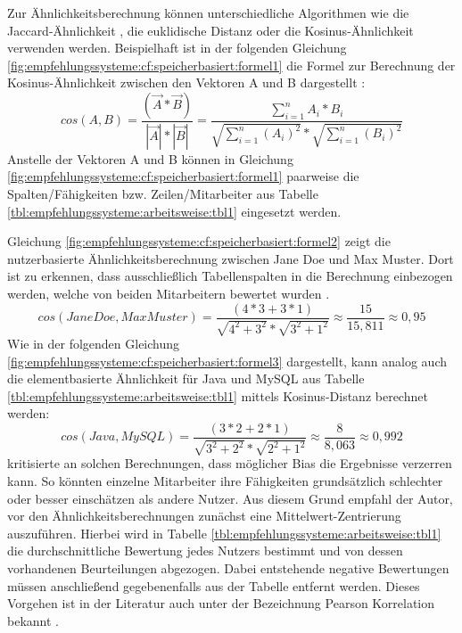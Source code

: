 Zur Ähnlichkeitsberechnung können unterschiedliche Algorithmen wie die Jaccard-Ähnlichkeit \cite[S. 2]{bharti:2019}, die euklidische Distanz \cite[S. 3]{cheng:2013} oder die Kosinus-Ähnlichkeit \cite[S. 2]{duong:2018} verwenden werden. Beispielhaft ist in der folgenden Gleichung \ref{fig:empfehlungssysteme:cf:speicherbasiert:formel1} die Formel zur Berechnung der Kosinus-Ähnlichkeit zwischen den Vektoren A und B dargestellt \cite[S. 111]{bharti:2019}:
\begin{equation}
cos(A,B) = \frac{(\vec{A} * \vec{B})}{|\vec{A}| * |\vec{B}|} = \frac{\sum_{i=1}^n A_i * B_i}{\sqrt{\sum_{i=1}^n (A_i)^2} * \sqrt{\sum_{i=1}^n (B_i)^2}}
\label{fig:empfehlungssysteme:cf:speicherbasiert:formel1}
\end{equation}
Anstelle der Vektoren A und B können in Gleichung \ref{fig:empfehlungssysteme:cf:speicherbasiert:formel1} paarweise die Spalten/Fähigkeiten bzw. Zeilen/Mitarbeiter aus Tabelle \ref{tbl:empfehlungssysteme:arbeitsweise:tbl1} eingesetzt werden.

Gleichung \ref{fig:empfehlungssysteme:cf:speicherbasiert:formel2} zeigt die nutzerbasierte Ähnlichkeitsberechnung zwischen Jane Doe und Max Muster. Dort ist zu erkennen, dass ausschließlich Tabellenspalten in die Berechnung einbezogen werden, welche von beiden Mitarbeitern bewertet wurden \cite[S. 2f.]{hao:2013}.
\begin{equation}
	cos(Jane Doe,Max Muster) = \frac{(4*3 + 3*1)}{\sqrt{4^2 + 3^2} * \sqrt{3^2 + 1^2}} \approx \frac{15}{15,811} \approx 0,95
	\label{fig:empfehlungssysteme:cf:speicherbasiert:formel2}
\end{equation}
Wie in der folgenden Gleichung \ref{fig:empfehlungssysteme:cf:speicherbasiert:formel3} dargestellt, kann analog auch die elementbasierte Ähnlichkeit für Java und MySQL aus Tabelle \ref{tbl:empfehlungssysteme:arbeitsweise:tbl1} mittels Kosinus-Distanz berechnet werden:
\begin{equation}
	cos(Java, MySQL) = \frac{(3*2 + 2*1)}{\sqrt{3^2 + 2^2} * \sqrt{2^2 + 1^2}} \approx \frac{8}{8,063} \approx 0,992
	\label{fig:empfehlungssysteme:cf:speicherbasiert:formel3}
\end{equation}
\textcite[S. 35ff.]{recommenderSystems:2016} kritisierte an solchen Berechnungen, dass möglicher Bias die Ergebnisse verzerren kann. So könnten einzelne Mitarbeiter ihre Fähigkeiten grundsätzlich schlechter oder besser einschätzen als andere Nutzer. Aus diesem Grund empfahl der Autor, vor den Ähnlichkeitsberechnungen zunächst eine Mittelwert-Zentrierung auszuführen. Hierbei wird in Tabelle \ref{tbl:empfehlungssysteme:arbeitsweise:tbl1} die durchschnittliche Bewertung jedes Nutzers bestimmt und von dessen vorhandenen Beurteilungen abgezogen. Dabei entstehende negative Bewertungen müssen anschließend gegebenenfalls aus der Tabelle entfernt werden. Dieses Vorgehen ist in der Literatur auch unter der Bezeichnung Pearson Korrelation bekannt \cite[S. 3]{bharti:2019}.

